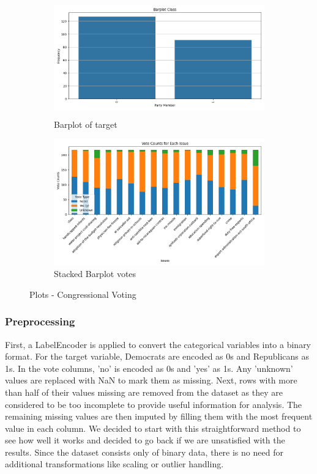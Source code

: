 \documentclass{article}
\begin{document}
\begin{figure}[H]
    \centering
    \begin{subfigure}[b]{0.45\textwidth}
        \centering
        \includegraphics[width=\linewidth, height=5cm]{barplot_target_votings.png} 
        \caption{Barplot of target}
        \label{fig:figure1}
    \end{subfigure}
    \hspace{0.05\textwidth} %
    \begin{subfigure}[b]{0.45\textwidth}
        \centering
        \includegraphics[width=\linewidth]{stacked_barplot.png} 
        \caption{Stacked Barplot votes}
        \label{fig:figure2}
    \end{subfigure}
    \caption{Plots - Congressional Voting}
    \label{fig:plots_voting}
\end{figure}


\subsubsection{Preprocessing}
First, a LabelEncoder is applied to convert the categorical variables into a binary format.  For the target variable, Democrats are encoded as 0s and Republicans as 1s.  In the vote columns, 'no' is encoded as 0s and 'yes' as 1s. Any 'unknown' values are replaced with NaN to mark them as missing. Next, rows with more than half of their values missing are removed from the dataset as they are considered to be too incomplete to provide useful information for analysis. The remaining missing values are then imputed by filling them with the most frequent value in each column. We decided to start with this straightforward method to see how well it works and decided to go back if we are unsatisfied with the results. Since the dataset consists only of binary data, there is no need for additional transformations like scaling or outlier handling. 
\end{document}
